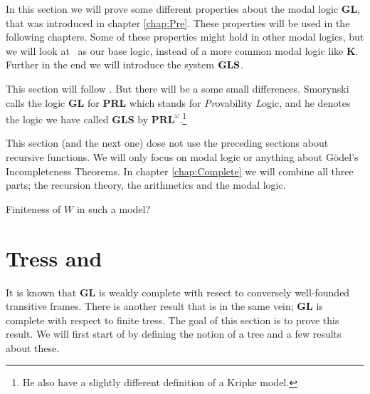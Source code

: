 \documentclass[../main.tex]{subfiles}
\begin{document}
In this section we will prove some different properties about the modal logic
\textbf{GL}, that was introduced in chapter \ref{chap:Pre}.
These properties will be used in the following chapters. Some of these properties might
hold in other modal logics, but we will look at \GL\ as our base logic,
instead of a more common modal logic like \textbf{K}.
Further in the end we will introduce the system $\text{\textbf{GLS}}$.

This section will follow \cite{Smor1985}. But there will be a some small
differences. Smorynski calls the logic \textbf{GL} for \textbf{PRL} which
stands for \textit{Pr}ovability \textit{L}ogic, and he denotes the logic we
have called \textbf{GLS} by $\textbf{PRL}^\omega$.\footnote{He also have a
slightly different definition of a Kripke model.}

This section (and the next one) dose not use the preceding sections about recursive functions. We will only
focus on modal logic or anything about Gödel's Incompleteness Theorems. In
chapter \ref{chap:Complete} we will combine all three parts; the recursion
theory, the arithmetics and the modal logic.


Finiteness of $W$ in such a model?
\section{Tress and \GL}

It is known that \textbf{GL} is weakly complete with resect to conversely
well-founded transitive frames. There is another result that is in the same
vein; \textbf{GL} is complete with respect to finite tress. The goal of this
section is to prove this result. We will first start of by defining the notion
of a tree and a few results about these.
\end{document}
